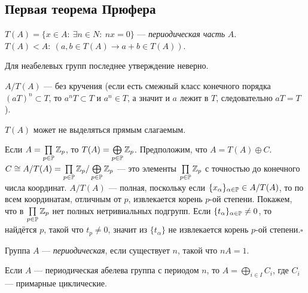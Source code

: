 \documentclass[10pt,a4paper]{article}%
\begin{document}
\subsection{Первая теорема Прюфера}

$T(A)=\{x\in A:~\exists n\in N:~nx=0\}$ --- {\em периодическая
часть} $A$. $T(A)<A:~(a,b\in
T(A)\rightarrow a+b\in T(A))$.

\begin{remark}
Для неабелевых групп последнее утверждение неверно.
\end{remark}

$A/T(A)$ --- без кручения (если есть смежный класс конечного
порядка $(aT)^n\subset T$, то $a^nT\subset T$ и $a^n\in T$, а
значит и $a$ лежит в $T$, следовательно $aT=T$).

\begin{example}
$T(A)$ может не выделяться прямым слагаемым.

Если $A=\prod\limits_{p\in\mathbb P}\mathbb Z_p$, то
$T(A)=\bigoplus\limits_{p\in\mathbb P}\mathbb Z_p$. Предположим, что
$A=T(A)\oplus C$. $C\cong
A/T(A)=\prod\limits_{p\in\mathbb P}\mathbb Z_p/\bigoplus\limits_{p\in\mathbb P}\mathbb Z_p$
--- это элементы $\prod\limits_{p\in\mathbb P}\mathbb Z_p$ с точностью до
конечного числа координат. $A/T(A)$ --- полная, поскольку если
$\{x_\alpha\}_{\alpha\in\mathbb P}\in A/T(A)$, то по всем координатам,
отличным от $p$, извлекается корень $p$-ой степени. Покажем, что в
$\prod\limits_{p\in\mathbb P}\mathbb Z_p$ нет полных нетривиальных подгрупп.
Если $\{t_\alpha\}_{\alpha\in\mathbb P}\ne 0$, то найдётся $p$, такой
что $t_p\ne 0$, значит из $\{t_\alpha\}$ не извлекается корень
$p$-ой степени.$\square$
\end{example}

Группа $A$ --- {\em периодическая},
если существует $n$, такой что $nA=1$.

\begin{theorem}Если $A$ --- периодическая абелева группа
с периодом $n$, то $A=\bigoplus\limits_{i\in I}C_i$, где $C_i$
--- примарные циклические.
\end{theorem}
\end{document}
